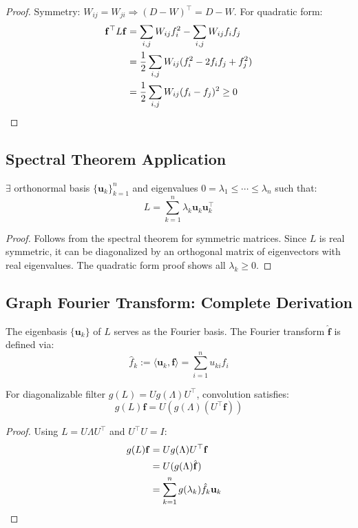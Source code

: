 \begin{notechapter}
\begin{proof}
Symmetry: $W_{ij}=W_{ji} \Rightarrow (D-W)^\top = D-W$. For quadratic form:
\begin{align*}
\mathbf{f}^\top L\mathbf{f} 
    &= \sum_{i,j} W_{ij}f_i^2 - \sum_{i,j} W_{ij}f_if_j \\
    &= \frac{1}{2}\sum_{i,j} W_{ij}(f_i^2 - 2f_if_j + f_j^2) \\
    &= \frac{1}{2}\sum_{i,j} W_{ij}(f_i - f_j)^2 \geq 0 \quad \qedhere
\end{align*}
\end{proof}

\subsection{Spectral Theorem Application}
\begin{theorem}
$\exists$ orthonormal basis $\{\mathbf{u}_k\}_{k=1}^n$ and eigenvalues 
$0 = \lambda_1 \leq \cdots \leq \lambda_n$ such that:
\[
L = \sum_{k=1}^n \lambda_k \mathbf{u}_k \mathbf{u}_k^\top
\]
\end{theorem}

\begin{proof}
Follows from the spectral theorem for symmetric matrices. Since $L$ is real 
symmetric, it can be diagonalized by an orthogonal matrix of eigenvectors with 
real eigenvalues. The quadratic form proof shows all $\lambda_k \geq 0$.
\end{proof}

\subsection{Graph Fourier Transform: Complete Derivation}
\begin{definition}
The eigenbasis $\{\mathbf{u}_k\}$ of $L$ serves as the Fourier basis. The 
Fourier transform $\hat{\mathbf{f}}$ is defined via:
\[
\hat{f}_k := \langle \mathbf{u}_k, \mathbf{f} \rangle = \sum_{i=1}^n u_{ki} f_i
\]
\end{definition}

\begin{theorem}
For diagonalizable filter $g(L) = U g(\Lambda) U^\top$, convolution satisfies:
\[
g(L)\mathbf{f} = U(g(\Lambda)(U^\top \mathbf{f}))
\]
\end{theorem}

\begin{proof}
Using $L = U\Lambda U^\top$ and $U^\top U = I$:
\begin{align*}
g(L)\mathbf{f} 
    &= U g(\Lambda) U^\top \mathbf{f} \\
    &= U (g(\Lambda) \hat{\mathbf{f}}) \\
    &= \sum_{k=1}^n g(\lambda_k) \hat{f}_k \mathbf{u}_k \quad \qedhere
\end{align*}
\end{proof}


\end{notechapter}
